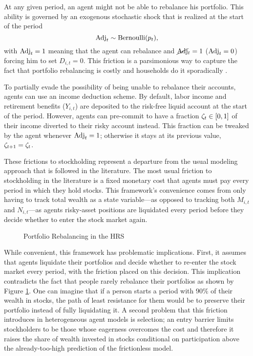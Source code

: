 \documentclass[./RiskyContrib.tex]{subfiles}
\begin{document}
At any given period, an agent might not be able to rebalance his portfolio.
This ability is governed by an exogenous stochastic shock that is realized
at the start of the period
\begin{equation*}
\text{Adj}_t \sim \text{Bernoulli}(p_t),
\end{equation*}
with $\text{Adj}_t=1$ meaning that the agent can rebalance and $\cancel{\text{Adj}}_t=1$ ($\text{Adj}_t = 0$)
forcing him to set $D_{i,t} = 0$. This friction is a parsimonious way to capture
the fact that portfolio rebalancing is costly and households do it sporadically
\cite{Giglio2019nber}.

To partially evade the possibility of being unable to rebalance their accounts, agents
can use an income deduction scheme. By default, labor income and retirement
benefits ($Y_{i,t}$) are deposited to the risk-free liquid account at the start
of the period. However, agents can pre-commit to have a fraction  $\zeta_t\in[0,1]$
of their income diverted to their risky account instead. This fraction can be
tweaked by the agent whenever $\text{Adj}_t = 1$; otherwise it stays at its
previous value, $\zeta_{t+1} = \zeta_t$.

These frictions to stockholding represent a departure from the usual modeling
approach that is followed in the literature. The most usual friction to
stockholding in the literature is a fixed monetary cost that agents must pay
every period in which they hold stocks. This framework's convenience comes from
only having to track total wealth as a state variable---as opposed to tracking
both $M_{i,t}$ and $N_{i,t}$---as agents risky-asset positions are liquidated
every period before they decide whether to enter the stock market again. 

\begin{figure}
\begin{center}
\end{center}
\caption{Portfolio Rebalancing in the HRS}\label{fig:rebalancing}
\end{figure}

While convenient, this framework has problematic implications. First, it assumes
that agents liquidate their portfolios and decide whether to re-enter the stock
market every period, with the friction placed on this decision. This implication
contradicts the fact that people rarely rebalance their portfolios as shown by 
Figure \ref{fig:rebalancing}. One can imagine that if a person starts a
period with $90\%$ of their wealth in stocks, the path of least resistance
for them would be to preserve their portfolio instead of fully liquidating it.
A second problem that this friction introduces in heterogeneous agent models
is selection; an entry barrier limits stockholders to be those whose eagerness
overcomes the cost and therefore it raises the share of wealth invested in stocks
conditional on participation above the already-too-high prediction of the
frictionless model.
\end{document}
